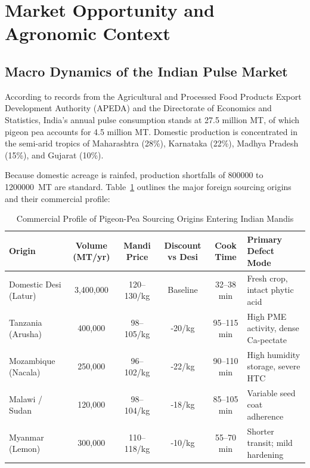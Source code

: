 \documentclass[10pt,a4paper]{article}
\newcommand{\inr}{\text{INR~}}
\begin{document}
\section{Market Opportunity and Agronomic Context}

\subsection{Macro Dynamics of the Indian Pulse Market}
According to records from the Agricultural and Processed Food Products Export Development Authority (APEDA) and the Directorate of Economics and Statistics, India's annual pulse consumption stands at \num{27.5} million MT, of which pigeon pea accounts for \num{4.5} million MT. Domestic production is concentrated in the semi-arid tropics of Maharashtra (\num{28}\%), Karnataka (\num{22}\%), Madhya Pradesh (\num{15}\%), and Gujarat (\num{10}\%).

Because domestic acreage is rainfed, production shortfalls of \num{800000} to \num{1200000}~MT are standard. Table~\ref{tab:import_origins} outlines the major foreign sourcing origins and their commercial profile:

\begin{table}[H]
\centering
\small
\caption{Commercial Profile of Pigeon-Pea Sourcing Origins Entering Indian Mandis}
\label{tab:import_origins}
\begin{tabularx}{\linewidth}{lccccX}
\toprule
\textbf{Origin} & \textbf{Volume (MT/yr)} & \textbf{Mandi Price} & \textbf{Discount vs Desi} & \textbf{Cook Time} & \textbf{Primary Defect Mode} \\
\midrule
Domestic Desi (Latur) & 3,400,000 & \inr 120--130/kg & Baseline & 32--38 min & Fresh crop, intact phytic acid \\
Tanzania (Arusha) & 400,000 & \inr 98--105/kg & -\inr 20/kg & 95--115 min & High PME activity, dense Ca-pectate \\
Mozambique (Nacala) & 250,000 & \inr 96--102/kg & -\inr 22/kg & 90--110 min & High humidity storage, severe HTC \\
Malawi / Sudan & 120,000 & \inr 98--104/kg & -\inr 18/kg & 85--105 min & Variable seed coat adherence \\
Myanmar (Lemon) & 300,000 & \inr 110--118/kg & -\inr 10/kg & 55--70 min & Shorter transit; mild hardening \\
\bottomrule
\end{tabularx}
\end{table}
\end{document}
